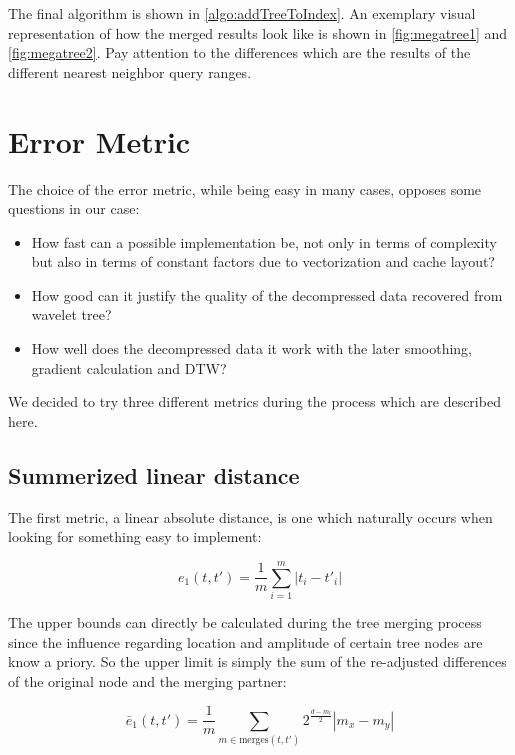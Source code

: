 The final algorithm is shown in \autoref{algo:addTreeToIndex}. An exemplary visual representation of how the merged results look like is shown in \autoref{fig:megatree1} and \autoref{fig:megatree2}. Pay attention to the differences which are the results of the different nearest neighbor query ranges.



\section{Error Metric}
\label{sec:algorithm:error}

The choice of the error metric, while being easy in many cases, opposes some questions in our case:

\begin{itemize}
    \item How fast can a possible implementation be, not only in terms of complexity but also in terms of constant factors due to vectorization and cache layout?
    \item How good can it justify the quality of the decompressed data recovered from wavelet tree?
    \item How well does the decompressed data it work with the later smoothing, gradient calculation and DTW\@?
\end{itemize}

We decided to try three different metrics during the process which are described here.


\subsection{Summerized linear distance}
\label{ssec:algorithm:error:linear}

The first metric, a linear absolute distance, is one which naturally occurs when looking for something easy to implement:

\begin{equation}\label{eq:e1}
    e_1\left(t, t'\right) = \frac{1}{m} \sum_{i=1}^m \left|t_i - t'_i\right|
\end{equation}

The upper bounds can directly be calculated during the tree merging process since the influence regarding location and amplitude of certain tree nodes are know a priory. So the upper limit is simply the sum of the re-adjusted differences of the original node and the merging partner:

\begin{equation}\label{eq:e1_up}
    \bar{e}_1\left(t, t'\right) = \frac{1}{m} \sum_{m \in \mathrm{merges}(t, t')} 2^\frac{d - m_l}{2} \left|m_x - m_y\right|
\end{equation}

